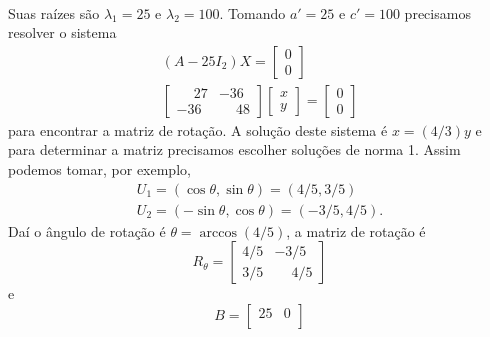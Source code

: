 \begin{exemplos}
\begin{enumerate}
\begin{solucao}
\begin{align*}
                  \end{align*}
                  Suas raízes são $\lambda_1 = 25$ e $\lambda_2 = 100$. Tomando $a' = 25$ e $c' = 100$ precisamos resolver o sistema
                  \begin{align*}
                      (A - 25I_2)X = \begin{bmatrix}
                                         0 \\0
                                     \end{bmatrix} \\
                      \begin{bmatrix}
                          \phantom{-}27 & -36           \\
                          -36           & \phantom{-}48
                      \end{bmatrix} \begin{bmatrix}
                                        x \\y
                                    \end{bmatrix} = \begin{bmatrix}
                                                        0 \\0
                                                    \end{bmatrix}
                  \end{align*}
                  para encontrar a matriz de rotação. A solução deste sistema é $x = (4/3)y$ e para determinar a matriz precisamos escolher soluções de
                  norma 1. Assim podemos tomar, por exemplo,
                  \begin{align*}
                      U_1 = (\cos\theta, \sin\theta) = (4/5, 3/5) \\
                      U_2 = (-\sin\theta, \cos\theta) = (-3/5, 4/5).
                  \end{align*}
                  Daí o ângulo de rotação é $\theta = \arccos(4/5)$, a matriz de rotação é
                  \[
                      R_\theta = \begin{bmatrix}
                          4/5 & -3/5           \\
                          3/5 & \phantom{-}4/5
                      \end{bmatrix}
                  \]
                  e
                  \[
                      B = \begin{bmatrix}
                          25 & 0   \\

\end{bmatrix}\]
\end{solucao}
\end{enumerate}
\end{exemplos}
